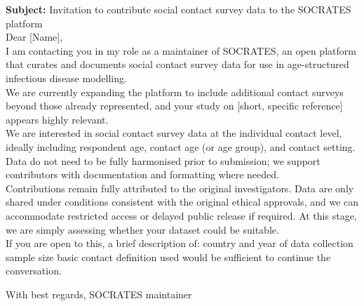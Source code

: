 \documentclass[11pt,a4paper]{article}
\begin{document}
\noindent \textbf{Subject:} Invitation to contribute social contact survey data to the SOCRATES platform \\

\noindent Dear [Name],  \\ 

\noindent I am contacting you in my role as a maintainer of SOCRATES, an open platform that curates and documents social contact survey data for use in age-structured infectious disease modelling.  \\

\noindent We are currently expanding the platform to include additional contact surveys beyond those already represented, and your study on [short, specific reference] appears highly relevant.  \\

\noindent We are interested in social contact survey data at the individual contact level, ideally including respondent age, contact age (or age group), and contact setting. Data do not need to be fully harmonised prior to submission; we support contributors with documentation and formatting where needed.  \\

\noindent Contributions remain fully attributed to the original investigators. Data are only shared under conditions consistent with the original ethical approvals, and we can accommodate restricted access or delayed public release if required. At this stage, we are simply assessing whether your dataset could be suitable.  \\

\noindent If you are open to this, a brief description of:
country and year of data collection
sample size
basic contact definition used
would be sufficient to continue the conversation.

\noindent With best regards,
\noindent [Name]
\noindent SOCRATES maintainer
\noindent [Institution]
\end{document}
